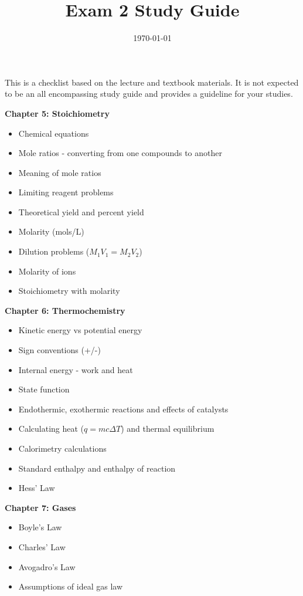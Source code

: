 \documentclass[12pt]{article}
\title{\textbf{Exam 2 Study Guide}}
\date{\today}
\begin{document}
\maketitle 

This is a checklist based on the lecture and textbook materials. It is not
expected to be an all encompassing study guide and provides a guideline for
your studies.

\textbf{Chapter 5: Stoichiometry}

\begin{itemize}
  \setlength\itemsep{0em}
\item Chemical equations
\item Mole ratios - converting from one compounds to another
\item Meaning of mole ratios
\item Limiting reagent problems
\item Theoretical yield and percent yield
\item Molarity (mols/L)
\item Dilution problems ($M_1V_1 = M_2V_2$)
\item Molarity of ions
\item Stoichiometry with molarity
\end{itemize}

\textbf{Chapter 6: Thermochemistry}

\begin{itemize}
  \setlength\itemsep{0em}
\item Kinetic energy vs potential energy
\item Sign conventions (+/-)
\item Internal energy - work and heat
\item State function
\item Endothermic, exothermic reactions and effects of catalysts
\item Calculating heat ($q=mc\Delta T$) and thermal equilibrium
\item Calorimetry calculations
\item Standard enthalpy and enthalpy of reaction
  \item Hess' Law
\end{itemize}

\textbf{Chapter 7: Gases}

\begin{itemize}
  \setlength\itemsep{0em}
\item Boyle's Law
\item Charles' Law
\item Avogadro's Law
\item Assumptions of ideal gas law
\end{itemize}
\end{document}

